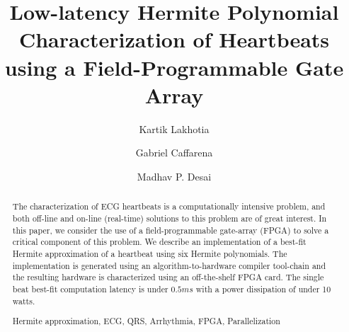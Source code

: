 \documentclass[runningheads]{llncs}
\newcommand{\keywords}[1]{\par\addvspace\baselineskip
\noindent\keywordname\enspace\ignorespaces#1}
\begin{document}
\mainmatter  %

\title{Low-latency Hermite Polynomial Characterization of Heartbeats using a Field-Programmable Gate Array}



%
%
\author{Kartik Lakhotia \and
 Gabriel Caffarena \and 
 Madhav P. Desai }





%
%
\maketitle


\begin{abstract}
The characterization of ECG heartbeats is a computationally intensive problem, and
both off-line and on-line (real-time) solutions to this problem are of great interest.
In this paper, we consider the use of a field-programmable gate-array (FPGA) to solve
a critical component of this problem. We describe an implementation of
a best-fit Hermite approximation of a heartbeat using six Hermite polynomials.  
The implementation is generated using an algorithm-to-hardware compiler tool-chain
and the resulting hardware is characterized using an off-the-shelf FPGA card.
The single beat best-fit computation latency is under $0.5ms$ with a power dissipation of under 10 watts. 

\keywords{Hermite approximation, ECG, QRS, Arrhythmia,  FPGA, Parallelization}
\end{abstract}
\end{document}
